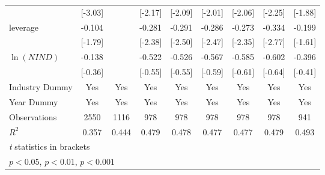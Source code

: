 {\begin{tabular}{l*{8}{c}}
                    &     [-3.03]         &                     &     [-2.17]         &     [-2.09]         &     [-2.01]         &     [-2.06]         &     [-2.25]         &     [-1.88]         \\
[1em]
leverage            &      -0.104         &                     &      -0.281\sym{*}  &      -0.291\sym{*}  &      -0.286\sym{*}  &      -0.273\sym{*}  &      -0.334\sym{**} &      -0.199         \\
                    &     [-1.79]         &                     &     [-2.38]         &     [-2.50]         &     [-2.47]         &     [-2.35]         &     [-2.77]         &     [-1.61]         \\
[1em]
 $ \ln(NIND) $      &      -0.138         &                     &      -0.522         &      -0.526         &      -0.567         &      -0.585         &      -0.602         &      -0.396         \\
                    &     [-0.36]         &                     &     [-0.55]         &     [-0.55]         &     [-0.59]         &     [-0.61]         &     [-0.64]         &     [-0.41]         \\
\hline
Industry Dummy      &         Yes         &         Yes         &         Yes         &         Yes         &         Yes         &         Yes         &         Yes         &         Yes         \\
Year Dummy          &         Yes         &         Yes         &         Yes         &         Yes         &         Yes         &         Yes         &         Yes         &         Yes         \\
Observations        &        2550         &        1116         &         978         &         978         &         978         &         978         &         978         &         941         \\
$ R^2 $             &       0.357         &       0.444         &       0.479         &       0.478         &       0.477         &       0.477         &       0.479         &       0.493         \\
\hline\hline
\multicolumn{9}{l}{\footnotesize \textit{t} statistics in brackets}\\
\multicolumn{9}{l}{\footnotesize \sym{*} \(p<0.05\), \sym{**} \(p<0.01\), \sym{***} \(p<0.001\)}\\
\end{tabular}
}
